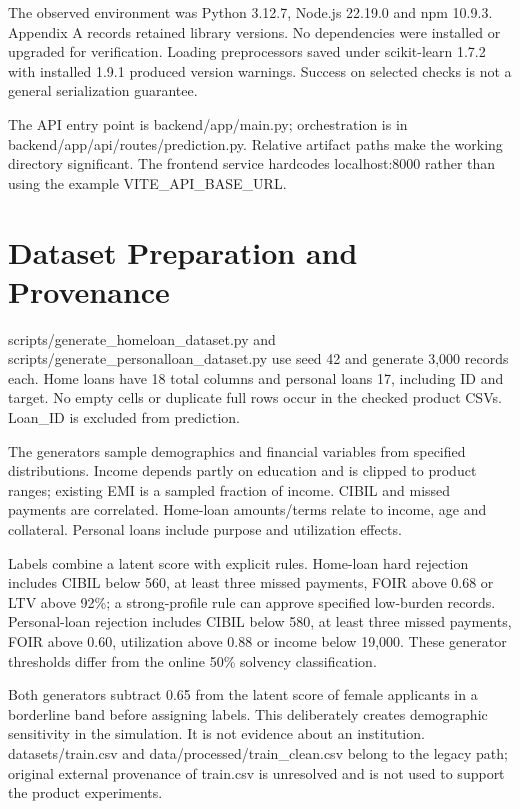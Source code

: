 \documentclass[12pt,a4paper]{report}
\begin{document}
The observed environment was Python 3.12.7, Node.js 22.19.0 and npm 10.9.3. Appendix A records retained library versions. No dependencies were installed or upgraded for verification. Loading preprocessors saved under scikit-learn 1.7.2 with installed 1.9.1 produced version warnings. Success on selected checks is not a general serialization guarantee.

The API entry point is backend/app/main.py; orchestration is in backend/app/api/routes/prediction.py. Relative artifact paths make the working directory significant. The frontend service hardcodes localhost:8000 rather than using the example VITE\_API\_BASE\_URL.

\section{Dataset Preparation and Provenance}
scripts/generate\_homeloan\_dataset.py and scripts/generate\_personalloan\_dataset.py use seed 42 and generate 3,000 records each. Home loans have 18 total columns and personal loans 17, including ID and target. No empty cells or duplicate full rows occur in the checked product CSVs. Loan\_ID is excluded from prediction.

The generators sample demographics and financial variables from specified distributions. Income depends partly on education and is clipped to product ranges; existing EMI is a sampled fraction of income. CIBIL and missed payments are correlated. Home-loan amounts/terms relate to income, age and collateral. Personal loans include purpose and utilization effects.

Labels combine a latent score with explicit rules. Home-loan hard rejection includes CIBIL below 560, at least three missed payments, FOIR above 0.68 or LTV above 92\%; a strong-profile rule can approve specified low-burden records. Personal-loan rejection includes CIBIL below 580, at least three missed payments, FOIR above 0.60, utilization above 0.88 or income below 19,000. These generator thresholds differ from the online 50\% solvency classification.

Both generators subtract 0.65 from the latent score of female applicants in a borderline band before assigning labels. This deliberately creates demographic sensitivity in the simulation. It is not evidence about an institution. datasets/train.csv and data/processed/train\_clean.csv belong to the legacy path; original external provenance of train.csv is unresolved and is not used to support the product experiments.
\end{document}
